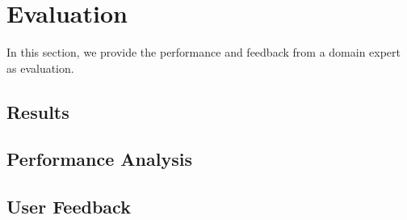 \clearpage
\section{Evaluation}
In this section, we provide the performance and feedback from a domain expert as evaluation.

\subsection{Results}

\subsection{Performance Analysis}

\subsection{User Feedback}